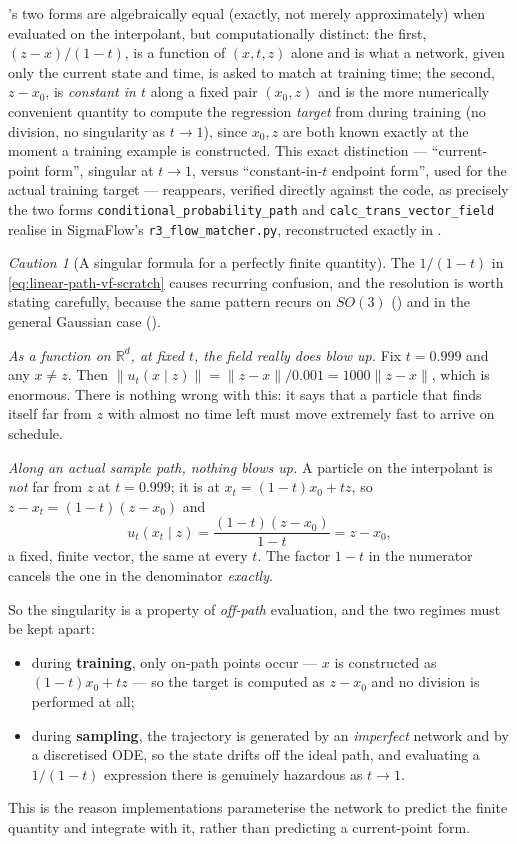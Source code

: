 \documentclass[11pt,a4paper]{report}
\theoremstyle{definition}
\theoremstyle{remark}
\newtheorem{caution}[caution]{Caution}
\newcommand{\RR}{\mathbb R}
\newcommand{\file}[1]{\texttt{#1}}
\newcommand{\pyfunc}[1]{\texttt{#1}}
\begin{document}
's two forms are algebraically
equal (exactly, not merely approximately) when evaluated on the
interpolant, but computationally distinct: the first,
$(z-x)/(1-t)$, is a function of $(x,t,z)$ alone and is what a network,
given only the current state and time, is asked to match at training time;
the second, $z-x_0$, is \emph{constant in $t$} along a fixed pair
$(x_0,z)$ and is the more numerically convenient quantity to compute the
regression \emph{target} from during training (no division, no
singularity as $t\to1$), since $x_0,z$ are both known exactly at the moment
a training example is constructed. This exact distinction --- ``current-point
form'', singular at $t\to1$, versus ``constant-in-$t$ endpoint form'',
used for the actual training target --- reappears, verified directly
against the code, as precisely the two forms
\pyfunc{conditional\_probability\_path} and
\pyfunc{calc\_trans\_vector\_field} realise in SigmaFlow's
\file{r3\_flow\_matcher.py}, reconstructed exactly in
.

\begin{caution}[A singular formula for a perfectly finite quantity]
\label{caution:endpoint-behaviour}
The $1/(1-t)$ in \eqref{eq:linear-path-vf-scratch} causes recurring
confusion, and the resolution is worth stating carefully, because the same
pattern recurs on $SO(3)$ () and in the
general Gaussian case ().

\emph{As a function on $\RR^d$, at fixed $t$, the field really does blow
up.} Fix $t=0.999$ and any $x\ne z$. Then
$\|u_t(x\mid z)\| = \|z-x\|/0.001 = 1000\|z-x\|$, which is enormous. There
is nothing wrong with this: it says that a particle that finds itself far
from $z$ with almost no time left must move extremely fast to arrive on
schedule.

\emph{Along an actual sample path, nothing blows up.} A particle on the
interpolant is \emph{not} far from $z$ at $t=0.999$; it is at
$x_t=(1-t)x_0+tz$, so $z-x_t=(1-t)(z-x_0)$ and
\[
u_t(x_t\mid z) = \frac{(1-t)(z-x_0)}{1-t} = z-x_0 ,
\]
a fixed, finite vector, the same at every $t$. The factor $1-t$ in the
numerator cancels the one in the denominator \emph{exactly}.

So the singularity is a property of \emph{off-path} evaluation, and the two
regimes must be kept apart:
\begin{itemize}
\item during \textbf{training}, only on-path points occur --- $x$ is
      constructed as $(1-t)x_0+tz$ --- so the target is computed as
      $z-x_0$ and no division is performed at all;
\item during \textbf{sampling}, the trajectory is generated by an
      \emph{imperfect} network and by a discretised ODE, so the state
      drifts off the ideal path, and evaluating a $1/(1-t)$ expression
      there is genuinely hazardous as $t\to1$.
\end{itemize}
This is the reason implementations parameterise the network to predict the
finite quantity and integrate with it, rather than predicting a
current-point form.
\end{caution}
\end{document}
